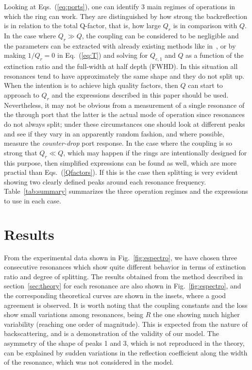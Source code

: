 \documentclass[10pt,letterpaper]{article}
\begin{document}
Looking at Eqs.~(\ref{eq:ports}), one can identify 3 main regimes of operations in which the ring can work. They are distinguished by how strong the backreflection is in relation to the total Q-factor, that is, how large $Q_r$ is in comparison with $Q$. In the case where $Q_r \gg Q$, the coupling can be considered to be negligible and the parameters can be extracted with already existing methods like in~\cite{McKinnon2009}, or by making $1/Q_r=0$ in Eq.~(\ref{eq:T}) and solving for $Q_{e,1}$ and $Q$ as a function of the extinction ratio and the full-width at half depth (FWHD). In this situation all resonances tend to have approximately the same shape and they do not split up. When the intention is to achieve high quality factors, then $Q$ can start to approach to $Q_r$ and the expressions described in this paper should be used. Nevertheless, it may not be obvious from a measurement of a single resonance of the through port that the latter is the actual mode of operation since resonances do not always split; under these circumstances one should look at different peaks and see if they vary in an apparently random fashion, and where possible, measure the \emph{counter-drop} port response. In the case where the coupling is so strong that $Q_r \ll Q$, which may happen if the rings are intentionally designed for this purpose, then simplified expressions can be found as well, which are more practial than Eqs.~(\ref{Qfactors}).  If this is the case then splitting is very evident showing two clearly defined peaks around each resonance frequency. Table~\ref{tab:summary} summarizes the three operation regimes and the expressions to use in each case.


\section{Results}

From the experimental data shown in Fig.~\ref{fig:espectro}, we have chosen three consecutive resonances which show quite different behavior in terms of extinction ratio and degree of splitting. The results obtained from the method described in section~\ref{sec:theory} for each resonance are also shown in Fig.~\ref{fig:espectro}, and the corresponding theoretical curves are shown in the insets, where a good agreement is observed. It is worth noting that the coupling constants and the loss show small variations among resonances, being $R$ the one showing much higher variability (reaching one order of magnitude). This is expected from the nature of backscattering, and is a demonstration of the validity of our model. The asymmetry of the shape of peaks 1 and 3, which is not reproduced in the theory, can be explained by sudden variations in the reflection coefficient along the width of the resonance, which was not considered in the model.
\end{document}
